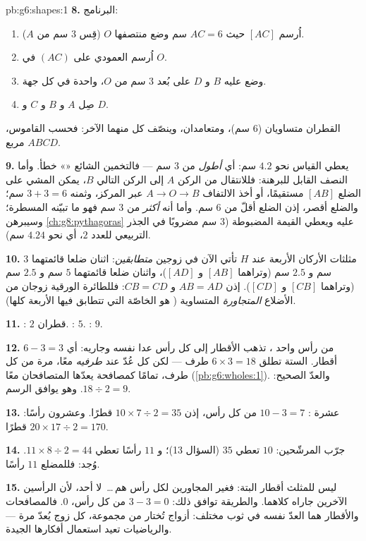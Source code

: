 \begin{solution}{pb:g6:shapes:1}
\textbf{8.} البرنامج:
\begin{enumerate}
  \item اُرسم  $[AC]$ حيث $AC = 6$ سم وضع
        منتصفها $O$ (قِس $3$ سم من $A$).
  \item اُرسم العمودي على $(AC)$ في $O$.
  \item وضع عليه $B$ و $D$ على بُعد $3$ سم من $O$، واحدة في كل
        جهة.
  \item صِل $A$ و $B$ و $C$ و $D$.
\end{enumerate}
القطران متساويان ($6$ سم)، ومتعامدان، وينصّف كل منهما الآخر:
فحسب القاموس، $ABCD$ مربع.

\textbf{9.} يعطي القياس نحو $4.2$ سم: أي \emph{أطول} من
$3$ سم --- فالتخمين الشائع «» خطأ. وأما
النصف القابل للبرهنة: فللانتقال من الركن $A$ إلى الركن التالي $B$، يمكن
المشي على الضلع $[AB]$ مستقيمًا، أو أخذ الالتفاف
$A \to O \to B$ عبر المركز، وثمنه $3 + 3 = 6$ سم؛ والضلع
 أقصر، إذن الضلع أقلّ من $6$ سم.
وأما أنه \emph{أكثر} من $3$ سم فهو ما تبيّنه المسطرة؛
وسيبرهن \cref{ch:g8:pythagoras} عليه ويعطي القيمة المضبوطة
($3$ سم مضروبًا في الجذر التربيعي للعدد $2$، أي نحو $4.24$ سم).

\textbf{10.} مثلثات الأركان الأربعة عند $H$ تأتي الآن في
زوجين \emph{متطابقين}: اثنان ضلعا قائمتهما $3$ سم و $2.5$ سم
(وتراهما $[AB]$ و $[AD]$)، واثنان ضلعا قائمتهما $5$ سم و
$2.5$ سم (وتراهما $[CB]$ و $[CD]$). إذن $AB = AD$ و
$CB = CD$: فللطائرة الورقية زوجان من الأضلاع \emph{المتجاورة}
المتساوية ( هو  الخاصّة التي تتطابق فيها الأربعة كلها).

\textbf{11.} : $2$ قطران. : $5$.
: $9$.

\textbf{12.} من رأس واحد ، تذهب الأقطار إلى
كل رأس عدا نفسه وجاريه: أي $6 - 3 = 3$
أقطار.  الستة تطلق $6 \times 3 = 18$ طرف 
--- لكن كل  عُدّ عند \emph{طرفيه} معًا،
مرة من كل طرف، تمامًا كمصافحة يعدّها
المتصافحان معًا (\cref{pb:g6:wholes:1}). والعدّ الصحيح:
$18 \div 2 = 9$. وهو يوافق الرسم.

\textbf{13.} عشرة : $10 - 3 = 7$ من كل رأس، إذن
$10 \times 7 \div 2 = 35$ قطرًا. وعشرون رأسًا:
$20 \times 17 \div 2 = 170$ قطرًا.

\textbf{14.} جرّب المرشّحين: $10$  تعطي $35$ (السؤال
13)؛ و $11$ رأسًا تعطي $11 \times 8 \div 2 = 44$. وُجد: فللمضلع
$11$ رأسًا.

\textbf{15.} ليس للمثلث أقطار البتة: فغير المجاورين
لكل رأس هم\,\dots\ لا أحد، لأن الرأسين الآخرين
جاراه كلاهما. والطريقة توافق ذلك:
$3 - 3 = 0$ من كل رأس،  $0$. فالمصافحات
والأقطار هما العدّ نفسه في ثوب مختلف: أزواج تُختار
من مجموعة، كل زوج يُعدّ مرة --- والرياضيات تعيد استعمال
أفكارها الجيدة.
\end{solution}
